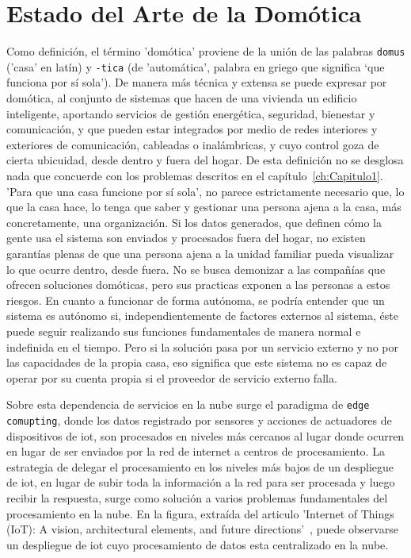 \cleardoublepage

\chapter{Estado del Arte de la Domótica}
\label{ch:Capitulo2}

Como definición, el término 'domótica' proviene de la unión de las palabras \verb|domus| ('casa' en latín) y \verb|-tica| (de 'automática', palabra en griego que significa ‘que funciona por sí sola’). De manera más técnica y extensa se puede expresar por domótica, al conjunto de sistemas que hacen de una vivienda un edificio inteligente, aportando servicios de gestión energética, seguridad, bienestar y comunicación, y que pueden estar integrados por medio de redes interiores y exteriores de comunicación, cableadas o inalámbricas, y cuyo control goza de cierta ubicuidad, desde dentro y fuera del hogar. De esta definición no se desglosa nada que concuerde con los problemas descritos en el capítulo~\ref{ch:Capitulo1}. 'Para que una casa funcione por sí sola', no parece estrictamente necesario que, lo que la casa hace, lo tenga que saber y gestionar una persona ajena a la casa, más concretamente, una organización. Si los datos generados, que definen cómo la gente usa el sistema son enviados y procesados fuera del hogar, no existen garantías plenas de que una persona ajena a la unidad familiar pueda visualizar lo que ocurre dentro, desde fuera. No se busca demonizar a las compañías que ofrecen soluciones domóticas, pero sus practicas exponen a las personas a estos riesgos. En cuanto a funcionar de forma autónoma, se podría entender que un sistema es autónomo si, independientemente de factores externos al sistema, éste puede seguir realizando sus funciones fundamentales de manera normal e indefinida en el tiempo. Pero si la solución pasa por un servicio externo y no por las capacidades de la propia casa, eso significa que este sistema no es capaz de operar por su cuenta propia si el proveedor de servicio externo falla.

\vspace{1cm}

Sobre esta dependencia de servicios en la nube surge el paradigma de \verb|edge comupting|, donde los datos registrado por sensores y acciones de actuadores de dispositivos de \gls{iot}, son procesados en niveles más cercanos al lugar donde ocurren en lugar de ser enviados por la red de internet a centros de procesamiento. La estrategia de delegar el procesamiento en los niveles más bajos de un despliegue de \gls{iot}, en lugar de subir toda la información a la red para ser procesada y luego recibir la respuesta, surge como solución a varios problemas fundamentales del procesamiento en la nube. En la figura, extraída del articulo 'Internet of Things (IoT): A vision, architectural elements, and future directions'~\cite{gubbi2013internet}, puede observarse un despliegue de \gls{iot} cuyo procesamiento de datos esta centralizado en la nube.

